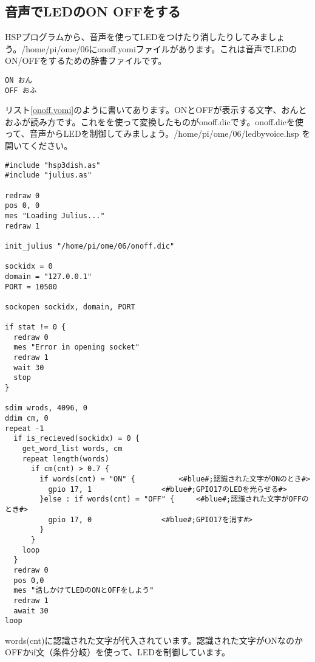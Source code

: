 \subsection{音声でLEDのON OFFをする}
HSPプログラムから、音声を使ってLEDをつけたり消したりしてみましょう。/home/pi/ome/06にonoff.yomiファイルがあります。これは音声でLEDのON/OFFをするための辞書ファイルです。\\

\begin{lstlisting}[caption=onoff.yomi,label=onoff.yomi]
ON おん
OFF おふ
\end{lstlisting}

リスト\ref{onoff.yomi}のように書いてあります。ONとOFFが表示する文字、おんとおふが読み方です。これをを使って変換したものがonoff.dicです。onoff.dicを使って、音声からLEDを制御してみましょう。/home/pi/ome/06/ledbyvoice.hsp を開いてください。\\

\begin{lstlisting}[caption=ledvoice.hsp,label=ledvoice.hsp]
#include "hsp3dish.as"
#include "julius.as"

redraw 0
pos 0, 0
mes "Loading Julius..."
redraw 1

init_julius "/home/pi/ome/06/onoff.dic"

sockidx = 0
domain = "127.0.0.1"
PORT = 10500

sockopen sockidx, domain, PORT

if stat != 0 {
  redraw 0
  mes "Error in opening socket"
  redraw 1
  wait 30
  stop
}

sdim wrods, 4096, 0
ddim cm, 0
repeat -1
  if is_recieved(sockidx) = 0 {
    get_word_list words, cm
    repeat length(words)
      if cm(cnt) > 0.7 {
        if words(cnt) = "ON" {			<#blue#;認識された文字がONのとき#>
          gpio 17, 1				<#blue#;GPIO17のLEDを光らせる#>
        }else : if words(cnt) = "OFF" {		<#blue#;認識された文字がOFFのとき#>
          gpio 17, 0				<#blue#;GPIO17を消す#>
        }
      }
    loop
  }
  redraw 0
  pos 0,0
  mes "話しかけてLEDのONとOFFをしよう"
  redraw 1
  await 30
loop
\end{lstlisting}

words(cnt)に認識された文字が代入されています。認識された文字がONなのかOFFかif文（条件分岐）を使って、LEDを制御しています。\\

